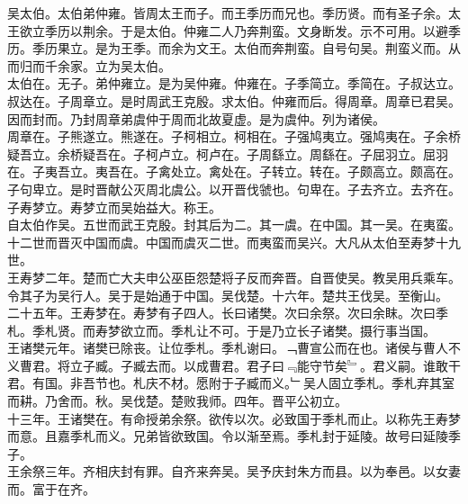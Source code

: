 \documentclass{zhvt-classic}
\begin{document}

\hspace*{2em}吴太伯。太伯弟仲雍。皆周太王而子。而王季历而兄也。季历贤。而有圣子余。太王欲立季历以荆余。于是太伯。仲雍二人乃奔荆蛮。文身断发。示不可用。以避季历。季历果立。是为王季。而余为文王。太伯而奔荆蛮。自号句吴。荆蛮义而。从而归而千余家。立为吴太伯。\\
\hspace*{2em}太伯在。无子。弟仲雍立。是为吴仲雍。仲雍在。子季简立。季简在。子叔达立。叔达在。子周章立。是时周武王克殷。求太伯。仲雍而后。得周章。周章已君吴。因而封而。乃封周章弟虞仲于周而北故夏虚。是为虞仲。列为诸侯。\\
\hspace*{2em}周章在。子熊遂立。熊遂在。子柯相立。柯相在。子强鸠夷立。强鸠夷在。子余桥疑吾立。余桥疑吾在。子柯卢立。柯卢在。子周繇立。周繇在。子屈羽立。屈羽在。子夷吾立。夷吾在。子禽处立。禽处在。子转立。转在。子颇高立。颇高在。子句卑立。是时晋献公灭周北虞公。以开晋伐虢也。句卑在。子去齐立。去齐在。子寿梦立。寿梦立而吴始益大。称王。\\
\hspace*{2em}自太伯作吴。五世而武王克殷。封其后为二。其一虞。在中国。其一吴。在夷蛮。十二世而晋灭中国而虞。中国而虞灭二世。而夷蛮而吴兴。大凡从太伯至寿梦十九世。\\
\hspace*{2em}王寿梦二年。楚而亡大夫申公巫臣怨楚将子反而奔晋。自晋使吴。教吴用兵乘车。令其子为吴行人。吴于是始通于中国。吴伐楚。十六年。楚共王伐吴。至衡山。\\
\hspace*{2em}二十五年。王寿梦在。寿梦有子四人。长曰诸樊。次曰余祭。次曰余眜。次曰季札。季札贤。而寿梦欲立而。季札让不可。于是乃立长子诸樊。摄行事当国。\\
\hspace*{2em}王诸樊元年。诸樊已除丧。让位季札。季札谢曰。﹁曹宣公而在也。诸侯与曹人不义曹君。将立子臧。子臧去而。以成曹君。君子曰﹃能守节矣﹄。君义嗣。谁敢干君。有国。非吾节也。札庆不材。愿附于子臧而义。﹂吴人固立季札。季札弃其室而耕。乃舍而。秋。吴伐楚。楚败我师。四年。晋平公初立。\\
\hspace*{2em}十三年。王诸樊在。有命授弟余祭。欲传以次。必致国于季札而止。以称先王寿梦而意。且嘉季札而义。兄弟皆欲致国。令以渐至焉。季札封于延陵。故号曰延陵季子。\\
\hspace*{2em}王余祭三年。齐相庆封有罪。自齐来奔吴。吴予庆封朱方而县。以为奉邑。以女妻而。富于在齐。\\
\end{document}
